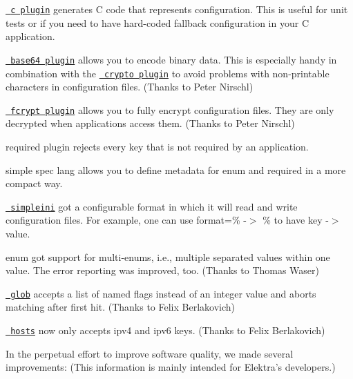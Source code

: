\begin{DoxyItemize}
\item \href{https://master.libelektra.org/src/plugins/c}{\texttt{ c plugin}} generates C code that represents configuration. This is useful for unit tests or if you need to have hard-\/coded fallback configuration in your C application.
\item \href{https://master.libelektra.org/src/plugins/base64}{\texttt{ base64 plugin}} allows you to encode binary data. This is especially handy in combination with the \href{https://master.libelektra.org/src/plugins/crypto}{\texttt{ crypto plugin}} to avoid problems with non-\/printable characters in configuration files. (Thanks to Peter Nirschl)
\item \href{https://master.libelektra.org/src/plugins/fcrypt}{\texttt{ fcrypt plugin}} allows you to fully encrypt configuration files. They are only decrypted when applications access them. (Thanks to Peter Nirschl)
\item required plugin rejects every key that is not required by an application.
\item simple spec lang allows you to define metadata for enum and required in a more compact way.
\end{DoxyItemize}


\begin{DoxyItemize}
\item \href{https://master.libelektra.org/src/plugins/simpleini}{\texttt{ simpleini}} got a configurable format in which it will read and write configuration files. For example, one can use {\ttfamily format=\% -\/$>$ \%} to have {\ttfamily key -\/$>$ value}.
\item enum got support for multi-\/enums, i.\+e., multiple separated values within one value. The error reporting was improved, too. (Thanks to Thomas Waser)
\item \href{https://master.libelektra.org/src/plugins/glob}{\texttt{ glob}} accepts a list of named flags instead of an integer value and aborts matching after first hit. (Thanks to Felix Berlakovich)
\item \href{https://master.libelektra.org/src/plugins/hosts}{\texttt{ hosts}} now only accepts {\ttfamily ipv4} and {\ttfamily ipv6} keys. (Thanks to Felix Berlakovich)
\end{DoxyItemize}

In the perpetual effort to improve software quality, we made several improvements\+: (This information is mainly intended for Elektra’s developers.)



